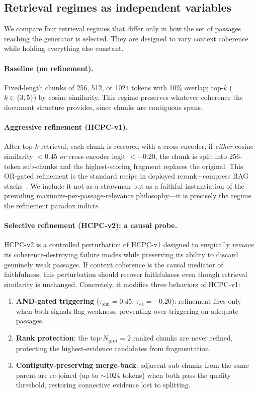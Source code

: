 \subsection{Retrieval regimes as independent variables}

We compare four retrieval regimes that differ only in how the set of
passages reaching the generator is selected. They are designed to vary
context coherence while holding everything else constant.

\paragraph{Baseline (no refinement).}
Fixed-length chunks of 256, 512, or 1024 tokens with 10\% overlap; top-$k$
($k\in\{3,5\}$) by cosine similarity. This regime preserves whatever
coherence the document structure provides, since chunks are contiguous
spans.

\paragraph{Aggressive refinement (HCPC-v1).}
After top-$k$ retrieval, each chunk is rescored with a cross-encoder; if
\emph{either} cosine similarity $<0.45$ \emph{or} cross-encoder logit
$<-0.20$, the chunk is split into 256-token sub-chunks and the
highest-scoring fragment replaces the original. This OR-gated refinement is
the standard recipe in deployed rerank+compress RAG
stacks~\citep{xu2023recomp, nogueira2019passage}. We include it not as a
strawman but as a faithful instantiation of the prevailing
maximize-per-passage-relevance philosophy---it is precisely the regime the
refinement paradox indicts.

\paragraph{Selective refinement (HCPC-v2): a causal probe.}
HCPC-v2 is a controlled perturbation of HCPC-v1 designed to surgically
\emph{remove} its coherence-destroying failure modes while preserving its
ability to discard genuinely weak passages. If context coherence is the
causal mediator of faithfulness, this perturbation should recover
faithfulness even though retrieval similarity is unchanged. Concretely, it
modifies three behaviors of HCPC-v1:

\begin{enumerate}
  \item \textbf{AND-gated triggering} ($\tau_{\text{sim}}{=}0.45$,
        $\tau_{\text{ce}}{=}-0.20$): refinement fires only when both
        signals flag weakness, preventing over-triggering on adequate
        passages.
  \item \textbf{Rank protection}: the top-$N_{\text{prot}}{=}2$ ranked
        chunks are never refined, protecting the highest-evidence
        candidates from fragmentation.
  \item \textbf{Contiguity-preserving merge-back}: adjacent sub-chunks from
        the same parent are re-joined (up to $\sim$1024 tokens) when both
        pass the quality threshold, restoring connective evidence lost to
        splitting.
\end{enumerate}


